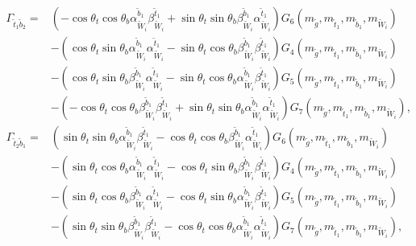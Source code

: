 \documentclass[final,3p,times]{elsarticle}
\begin{document}
\begin{equation}
\begin{aligned}
\Gamma_{\tilde{t}_1 \tilde{b}_2} = & (-\cos\theta_t \cos\theta_b \alpha_{\tilde{W}_i}^{\tilde{b}_1} \beta_{\tilde{W}_i}^{\tilde{t}_1} + \sin\theta_t \sin\theta_b \beta_{\tilde{W}_i}^{\tilde{b}_1} \alpha_{\tilde{W}_i}^{\tilde{t}_1})G_{6}(m_{\tilde{g}},m_{\tilde{t}_1},m_{\tilde{b}_1},m_{\tilde{W}_i}) \\ & - (\cos\theta_t \sin\theta_b \alpha_{\tilde{W}_i}^{\tilde{b}_1}\alpha_{\tilde{W}_i}^{\tilde{t}_1} - \sin\theta_t \cos\theta_b \beta_{\tilde{W}_i}^{\tilde{b}_1}\beta_{\tilde{W}_i}^{\tilde{t}_1}) G_{4}(m_{\tilde{g}},m_{\tilde{t}_1}, m_{\tilde{b}_1},m_{\tilde{W}_i}) \\ & - (\cos\theta_t \sin\theta_b \beta_{\tilde{W}_i}^{\tilde{b}_1} \alpha_{\tilde{W}_i}^{\tilde{t}_1} - \sin\theta_t \cos\theta_b \alpha_{\tilde{W}_i}^{\tilde{b}_1} \beta_{\tilde{W}_i}^{\tilde{t}_1})G_{5}(m_{\tilde{g}},m_{\tilde{t}_1}, m_{\tilde{b}_1}, m_{\tilde{W}_i}) \\ & - (-\cos\theta_t\cos\theta_b \beta_{\tilde{W}_i}^{\tilde{b}_1} \beta_{\tilde{W}_i}^{\tilde{t}_1} + \sin\theta_t \sin\theta_b \alpha_{\tilde{W}_i}^{\tilde{b}_1} \alpha_{\tilde{W}_i}^{\tilde{t}_1})G_{7}(m_{\tilde{g}},m_{\tilde{t}_1},m_{\tilde{b}_1},m_{\tilde{W}_i}),
\end{aligned}
\end{equation}
\begin{equation}
\begin{aligned}
\Gamma_{\tilde{t}_2 \tilde{b}_1} = & (\sin\theta_t \sin\theta_b \alpha_{\tilde{W}_i}^{\tilde{b}_1} \beta_{\tilde{W}_i}^{\tilde{t}_1} - \cos\theta_t \cos\theta_b \beta_{\tilde{W}_i}^{\tilde{b}_1} \alpha_{\tilde{W}_i}^{\tilde{t}_1})G_{6}(m_{\tilde{g}},m_{\tilde{t}_1},m_{\tilde{b}_1},m_{\tilde{W}_i}) \\ & - (\sin\theta_t \cos\theta_b \alpha_{\tilde{W}_i}^{\tilde{b}_1}\alpha_{\tilde{W}_i}^{\tilde{t}_1} - \cos\theta_t \sin\theta_b \beta_{\tilde{W}_i}^{\tilde{b}_1}\beta_{\tilde{W}_i}^{\tilde{t}_1}) G_{4}(m_{\tilde{g}},m_{\tilde{t}_1}, m_{\tilde{b}_1},m_{\tilde{W}_i}) \\ & - (\sin\theta_t \cos\theta_b \beta_{\tilde{W}_i}^{\tilde{b}_1} \alpha_{\tilde{W}_i}^{\tilde{t}_1} - \cos\theta_t \sin\theta_b \alpha_{\tilde{W}_i}^{\tilde{b}_1} \beta_{\tilde{W}_i}^{\tilde{t}_1})G_{5}(m_{\tilde{g}},m_{\tilde{t}_1}, m_{\tilde{b}_1}, m_{\tilde{W}_i}) \\ & - (\sin\theta_t\sin\theta_b \beta_{\tilde{W}_i}^{\tilde{b}_1} \beta_{\tilde{W}_i}^{\tilde{t}_1} - \cos\theta_t \cos\theta_b \alpha_{\tilde{W}_i}^{\tilde{b}_1} \alpha_{\tilde{W}_i}^{\tilde{t}_1})G_{7}(m_{\tilde{g}},m_{\tilde{t}_1},m_{\tilde{b}_1},m_{\tilde{W}_i}),
\end{aligned}
\end{equation}
\end{document}
